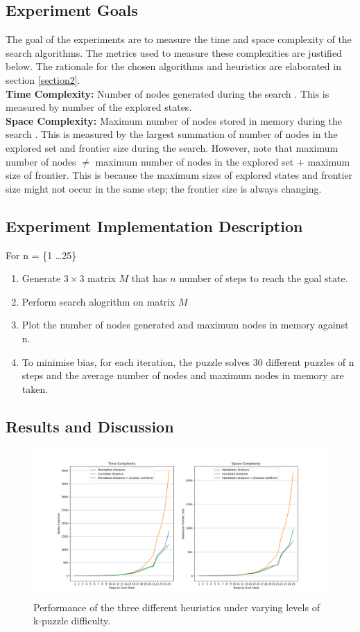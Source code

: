 \documentclass[runningheads]{llncs}
\begin{document}
\subsection{Experiment Goals}
The goal of the experiments are to measure the time and space complexity of the search algorithms. The metrics used to measure these complexities are justified below. The rationale for the chosen algorithms and heuristics are elaborated in section \ref{section2}. \\
\textbf{Time Complexity:} Number of nodes generated during the search \cite[p80]{stuart_russell_artifical_2010}. This is measured by number of the explored states. \\
\textbf{Space Complexity:} Maximum number of nodes stored in memory during the search \cite[p80]{stuart_russell_artifical_2010}. This is measured by the largest summation of number of nodes in the explored set and frontier size during the search. 
However, note that maximum number of nodes \( \neq \) maximum number of nodes in the explored set + maximum size of frontier. This is because the maximum sizes of explored states and frontier size might not occur in the same step; the frontier size is always changing.

\subsection{Experiment Implementation Description}
For n = \{1 \dots 25\}
\begin{enumerate}
    \item Generate \(3 \times 3 \) matrix \( M \) that has \( n \) number of steps to reach the goal state.
    \item Perform search alogrithm on matrix \( M \)
    \item Plot the number of nodes generated and maximum nodes in memory against n. 
    \item To minimise bias, for each iteration, the puzzle solves 30 different puzzles of n steps and the average number of nodes and maximum nodes in memory are taken.
\end{enumerate}

\subsection{Results and Discussion}
\begin{figure}
    \includegraphics[width=\textwidth]{fig1.png}
    \caption{Performance of the three different heuristics under varying levels of k-puzzle difficulty.} \label{fig1}
    \end{figure}
\end{document}
